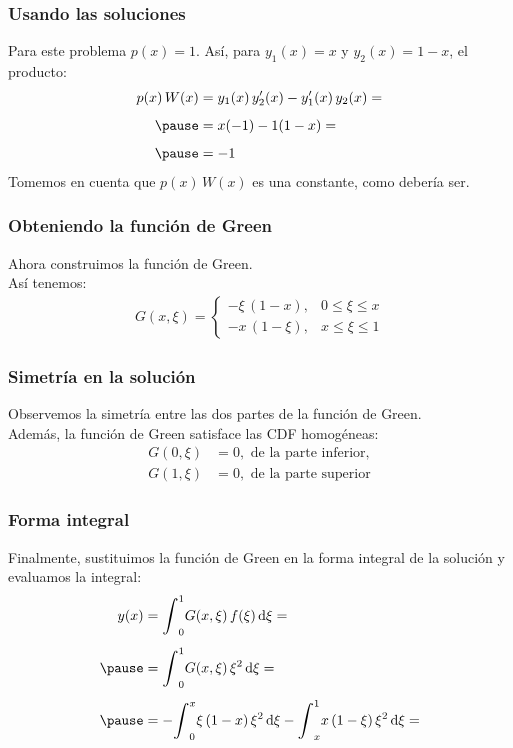 \documentclass[12pt]{beamer}
\begin{document}
\begin{frame}
\frametitle{Usando las soluciones}
Para este problema $p (x) = 1$. \pause Así, para $y_{1} (x) = x$ y $y_{2} (x) = 1 - x$, el producto:
\pause
\begin{eqnarray*}
\begin{aligned}
p (x) \, W (x) &=  y_{1} (x) \, \pderivada{y}_{2} (x) - \pderivada{y}_{1} (x) \, y_{2} (x) = \\[0.5em] \pause
&= x (-1) -  1(1 - x) = \\[0.5em] \pause
&= - 1
\end{aligned}
\end{eqnarray*}
Tomemos en cuenta que $p (x) \, W (x)$ es una constante, como debería ser.
\end{frame}

\begin{frame}
\frametitle{Obteniendo la función de Green}
Ahora construimos la función de Green.
\\
\bigskip
\pause
Así tenemos:
\pause
\begin{align}
G (x, \xi) = \begin{cases}
- \xi \, (1 - x), & 0 \leq \xi \leq x \\
- x \, (1 - \xi), & x \leq \xi \leq 1
\end{cases}
\label{eq:ecuacion_07_35}
\end{align}
\end{frame}

\begin{frame}
\frametitle{Simetría en la solución}
Observemos la simetría entre las dos partes de la función de Green. 
\\
\bigskip
\pause
Además, la función de Green satisface las CDF homogéneas: 
\pause
\begin{align*}
G (0, \xi) &= 0, \mbox{ de la parte inferior}, \\[0.5em]
G (1, \xi) &= 0, \mbox{ de la parte superior}
\end{align*}
\end{frame}

\begin{frame}
\frametitle{Forma integral}
Finalmente, sustituimos la función de Green en la forma integral de la solución y evaluamos la integral:
\pause
\begin{eqnarray*}
\begin{aligned}[b]
y (x) &= \scaleint{6ex}_{0}^{1} G (x, \xi) \, f (\xi) \dd{\xi} = \\[0.5em] \pause
&= \scaleint{6ex}_{0}^{1} G (x, \xi) \, \xi^{2} \dd{\xi} = \\[0.5em] \pause
&= - \scaleint{6ex}_{0}^{x} \xi \, (1 - x) \, \xi^{2} \dd{\xi} - \scaleint{6ex}_{x}^{1} x \, (1 - \xi) \, \xi^{2} \dd{\xi} = \\[0.5em]
\end{aligned}
\end{eqnarray*}
\end{frame}
\end{document}
